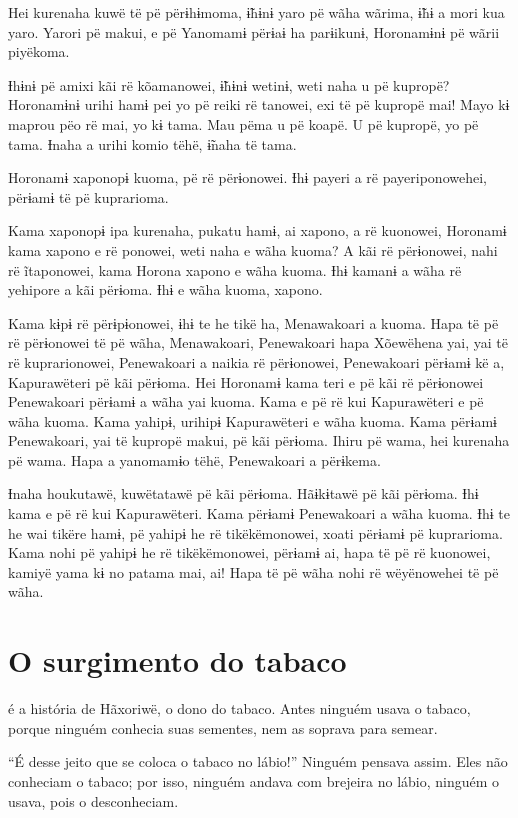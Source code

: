 Hei kurenaha kuwë të pë përɨhɨmoma, ɨ̃hɨnɨ yaro pë wãha wãrima, ɨ̃hɨ a
mori kua yaro. Yarori pë makui, e pë Yanomamɨ përɨaɨ ha parɨikunɨ,
Horonamɨnɨ pë wãrii piyëkoma. 

Ɨhɨnɨ pë amixi kãi rë kõamanowei, ɨ̃hɨnɨ wetinɨ, weti naha u pë kupropë?
Horonamɨnɨ urihi hamɨ pei yo pë reiki rë tanowei, exi të pë kupropë mai!
Mayo kɨ maprou pëo rë mai, yo kɨ tama. Mau pëma u pë koapë. U pë
kupropë, yo pë tama. Ɨnaha a urihi komio tëhë, ɨ̃naha të tama. 

Horonamɨ xaponopɨ kuoma, pë rë përɨonowei. Ɨhɨ payeri a rë
payeriponowehei, përɨamɨ të pë kuprarioma. 

Kama xaponopɨ ipa kurenaha, pukatu hamɨ, ai xapono, a rë kuonowei,
Horonamɨ kama xapono e rë ponowei, weti naha e wãha kuoma? A kãi rë
përɨonowei, nahi rë ĩtaponowei, kama Horona xapono e wãha kuoma. Ɨhɨ
kamanɨ a wãha rë yehipore a kãi përɨoma. Ɨhɨ e wãha kuoma, xapono. 

Kama kɨpɨ rë përɨpɨonowei, ɨhɨ te he tikë ha, Menawakoari a kuoma. Hapa
të pë rë përɨonowei të pë wãha, Menawakoari, Penewakoari hapa Xõewëhena
yai, yai të rë kuprarionowei, Penewakoari a naikia rë përɨonowei,
Penewakoari përɨamɨ kë a, Kapurawëteri pë kãi përɨoma. Hei Horonamɨ kama
teri e pë kãi rë përɨonowei Penewakoari përɨamɨ a wãha yai kuoma. Kama e
pë rë kui Kapurawëteri e pë wãha kuoma. Kama yahipɨ, urihipɨ
Kapurawëteri e wãha kuoma. Kama përɨamɨ Penewakoari, yai të kupropë
makui, pë kãi përɨoma. Ihiru pë wama, hei kurenaha pë wama. Hapa a
yanomamɨo tëhë, Penewakoari a përɨkema. 

Ɨnaha houkutawë, kuwëtatawë pë kãi përɨoma. Hãɨkɨtawë pë kãi përɨoma.
Ɨhɨ kama e pë rë kui Kapurawëteri. Kama përɨamɨ Penewakoari a wãha
kuoma. Ɨhɨ te he wai tikëre hamɨ, pë yahipɨ he rë tikëkëmonowei, xoati
përɨamɨ pë kuprarioma. Kama nohi pë yahipɨ he rë tikëkëmonowei, përɨamɨ
ai, hapa të pë rë kuonowei, kamiyë yama kɨ no patama mai, ai! Hapa të pë
wãha nohi rë wëyënowehei të pë wãha.
 
\chapter{O surgimento do tabaco}
 
 é a história de Hãxoriwë, o dono do tabaco. Antes ninguém usava o
tabaco, porque ninguém conhecia suas sementes, nem as soprava para
semear. 

``É desse jeito que se coloca o tabaco no lábio!'' Ninguém pensava
assim. Eles não conheciam o tabaco; por isso, ninguém andava com
brejeira no lábio, ninguém o usava, pois o desconheciam. 

